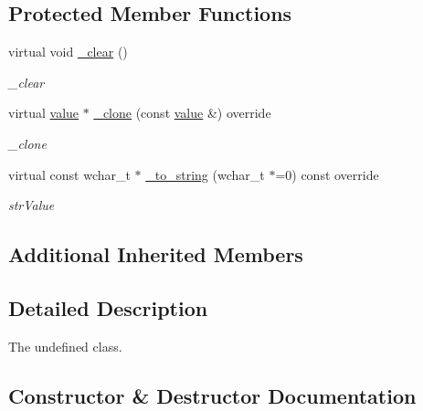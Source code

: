 \subsection*{Protected Member Functions}
\begin{DoxyCompactItemize}
\item 
virtual void \hyperlink{classformat_1_1undefined_abef78a03b54da4e0a7fb615d376a68d9}{\+\_\+clear} ()\hypertarget{classformat_1_1undefined_abef78a03b54da4e0a7fb615d376a68d9}{}\label{classformat_1_1undefined_abef78a03b54da4e0a7fb615d376a68d9}

\begin{DoxyCompactList}\small\item\em \+\_\+clear \end{DoxyCompactList}\item 
virtual \hyperlink{classformat_1_1value_aa6b85823936bf7b8ab78d3f8d443c00d}{value} $\ast$ \hyperlink{classformat_1_1undefined_aacb01d587e4e623a450e5e477d25bf71}{\+\_\+clone} (const \hyperlink{classformat_1_1value_aa6b85823936bf7b8ab78d3f8d443c00d}{value} \&) override
\begin{DoxyCompactList}\small\item\em \+\_\+clone \end{DoxyCompactList}\item 
virtual const wchar\+\_\+t $\ast$ \hyperlink{classformat_1_1undefined_af546183275e15e270dca846623a2d2c1}{\+\_\+to\+\_\+string} (wchar\+\_\+t $\ast$=0) const override
\begin{DoxyCompactList}\small\item\em str\+Value \end{DoxyCompactList}\end{DoxyCompactItemize}
\subsection*{Additional Inherited Members}


\subsection{Detailed Description}
The undefined class. 

\subsection{Constructor \& Destructor Documentation}
